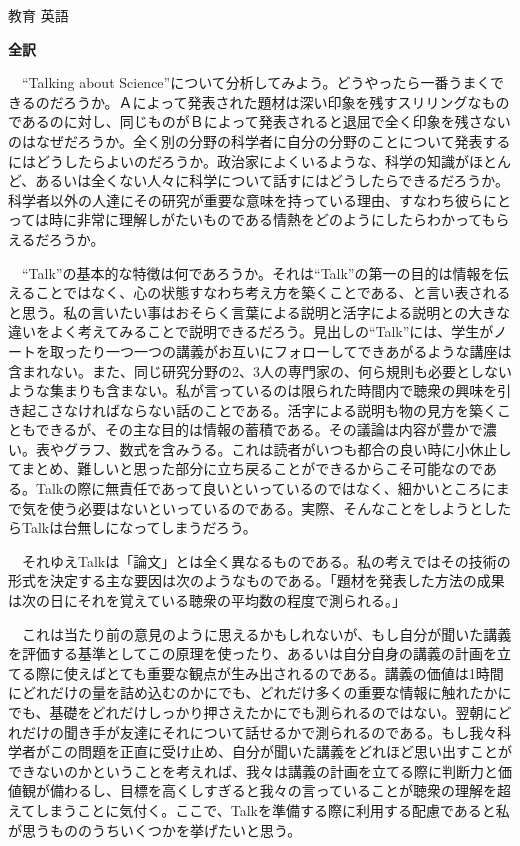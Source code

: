 \documentclass[fleqn]{jbook}
\begin{document}
\begin{answer}{教育 英語}{}
\begin{subanswers}
\SubAnswer
  {\bf 全訳}

　``Talking about Science''について分析してみよう。どうやったら一番うまくできるのだろうか。Ａによって発表された題材は深い印象を残すスリリングなものであるのに対し、同じものがＢによって発表されると退屈で全く印象を残さないのはなぜだろうか。全く別の分野の科学者に自分の分野のことについて発表するにはどうしたらよいのだろうか。政治家によくいるような、科学の知識がほとんど、あるいは全くない人々に科学について話すにはどうしたらできるだろうか。科学者以外の人達にその研究が重要な意味を持っている理由、すなわち彼らにとっては時に非常に理解しがたいものである情熱をどのようにしたらわかってもらえるだろうか。

　``Talk''の基本的な特徴は何であろうか。それは``Talk''の第一の目的は情報を伝えることではなく、心の状態すなわち考え方を築くことである、と言い表されると思う。私の言いたい事はおそらく言葉による説明と活字による説明との大きな違いをよく考えてみることで説明できるだろう。見出しの``Talk''には、学生がノートを取ったり一つ一つの講義がお互いにフォローしてできあがるような講座は含まれない。また、同じ研究分野の2、3人の専門家の、何ら規則も必要としないような集まりも含まない。私が言っているのは限られた時間内で聴衆の興味を引き起こさなければならない話のことである。活字による説明も物の見方を築くこともできるが、その主な目的は情報の蓄積である。その議論は内容が豊かで濃い。表やグラフ、数式を含みうる。これは読者がいつも都合の良い時に小休止してまとめ、難しいと思った部分に立ち戻ることができるからこそ可能なのである。Talkの際に無責任であって良いといっているのではなく、細かいところにまで気を使う必要はないといっているのである。実際、そんなことをしようとしたらTalkは台無しになってしまうだろう。

　それゆえTalkは「論文」とは全く異なるものである。私の考えではその技術の形式を決定する主な要因は次のようなものである。「題材を発表した方法の成果は次の日にそれを覚えている聴衆の平均数の程度で測られる。」

　これは当たり前の意見のように思えるかもしれないが、もし自分が聞いた講義を評価する基準としてこの原理を使ったり、あるいは自分自身の講義の計画を立てる際に使えばとても重要な観点が生み出されるのである。講義の価値は1時間にどれだけの量を詰め込むのかにでも、どれだけ多くの重要な情報に触れたかにでも、基礎をどれだけしっかり押さえたかにでも測られるのではない。翌朝にどれだけの聞き手が友達にそれについて話せるかで測られるのである。もし我々科学者がこの問題を正直に受け止め、自分が聞いた講義をどれほど思い出すことができないのかということを考えれば、我々は講義の計画を立てる際に判断力と価値観が備わるし、目標を高くしすぎると我々の言っていることが聴衆の理解を超えてしまうことに気付く。ここで、Talkを準備する際に利用する配慮であると私が思うもののうちいくつかを挙げたいと思う。


\end{subanswers}
\end{answer}
\end{document}

